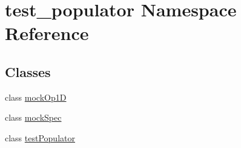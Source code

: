 \hypertarget{namespacetest__populator}{}\section{test\+\_\+populator Namespace Reference}
\label{namespacetest__populator}
\subsection*{Classes}
\begin{DoxyCompactItemize}
\item 
class \hyperlink{classtest__populator_1_1mockOp1D}{mock\+Op1D}
\item 
class \hyperlink{classtest__populator_1_1mockSpec}{mock\+Spec}
\item 
class \hyperlink{classtest__populator_1_1testPopulator}{test\+Populator}
\end{DoxyCompactItemize}
